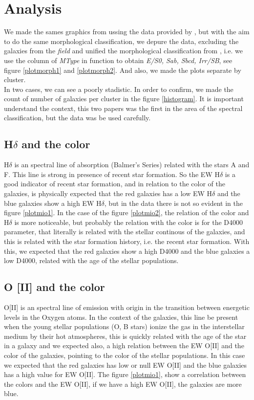\documentclass[fleqn,usenatbib]{mnras}
\begin{document}
\section{Analysis}
We made the sames graphics from \citet{Balogh} ussing the data provided by \citet{Dressler}, but with the aim to do the same morphological classification, we depure the data, excluding the galaxies from the \textit{field} and unified the morphological classification from \citet{Dressler}, i.e. we use the column of \textit{MType} in function to obtain \textit{E/S0, Sab, Sbcd, Irr/SB}, see figure \ref{plotmorph1} and \ref{plotmorph2}. And also, we made the plots separate by cluster. \\

In two cases, we can see a poorly stadistic. In order to confirm, we made the count of number of galaxies per cluster in the figure \ref{histogram}. It is important understand the context, this two papers was the first in the area of the spectral classification, but the data was be used carefully. \\

\subsection{H$\delta$ and the color}
H$\delta$ is an spectral line of absorption (Balmer's Series) related with the stars A and F. This line is strong in presence of recent star formation. So the EW H$\delta$ is a good indicator of recent star formation, and in relation to the color of the galaxies, is physically expected that the red galaxies has a low EW H$\delta$ and the blue galaxies show a high EW H$\delta$, but in the data there is not so evident in the figure \ref{plotmio1}. In the case of the figure \ref{plotmio2}, the relation of the color and H$\delta$ is more noticeable, but probably the relation with the color is for the D4000 parameter, that literally is related with the stellar continous of the galaxies, and this is related with the star formation history, i.e. the recent star formation. With this, we expected that the red galaxies show a high D4000 and the blue galaxies a low D4000, related with the age of the stellar populations. 

\subsection{O [II] and the color}
O[II] is an spectral line of emission with origin in the transition between energetic levels in the Oxygen atoms. In the context of the galaxies, this line be present when the young stellar populations (O, B stars) ionize the gas in the interstellar medium by their hot atmospheres, this is quickly related with the age of the star in a galaxy and we expected also, a high relation between the EW O[II] and the color of the galaxies, pointing to the color of the stellar populations. In this case we expected that the red galaxies has low or null EW O[II] and the blue galaxies has a high value for EW O[II]. The figure \ref{plotmio1}, show a correlation between the colors and the EW O[II], if we have a high EW O[II], the galaxies are more blue. 
\end{document}
